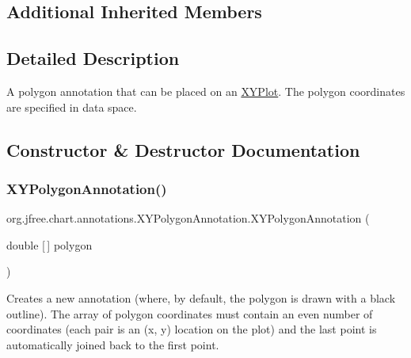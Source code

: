 \subsection*{Additional Inherited Members}


\subsection{Detailed Description}
A polygon annotation that can be placed on an \mbox{\hyperlink{}{X\+Y\+Plot}}. The polygon coordinates are specified in data space. 

\subsection{Constructor \& Destructor Documentation}
\mbox{\label{classorg_1_1jfree_1_1chart_1_1annotations_1_1_x_y_polygon_annotation_a4cf88109e32f06cfa5190a17f0abf857}} 
\subsubsection{\texorpdfstring{X\+Y\+Polygon\+Annotation()}{XYPolygonAnnotation()}\hspace{0.1cm}{\footnotesize\ttfamily [1/3]}}
{\footnotesize\ttfamily org.\+jfree.\+chart.\+annotations.\+X\+Y\+Polygon\+Annotation.\+X\+Y\+Polygon\+Annotation (\begin{DoxyParamCaption}\item[{double \mbox{[}$\,$\mbox{]}}]{polygon }\end{DoxyParamCaption})}

Creates a new annotation (where, by default, the polygon is drawn with a black outline). The array of polygon coordinates must contain an even number of coordinates (each pair is an (x, y) location on the plot) and the last point is automatically joined back to the first point.


